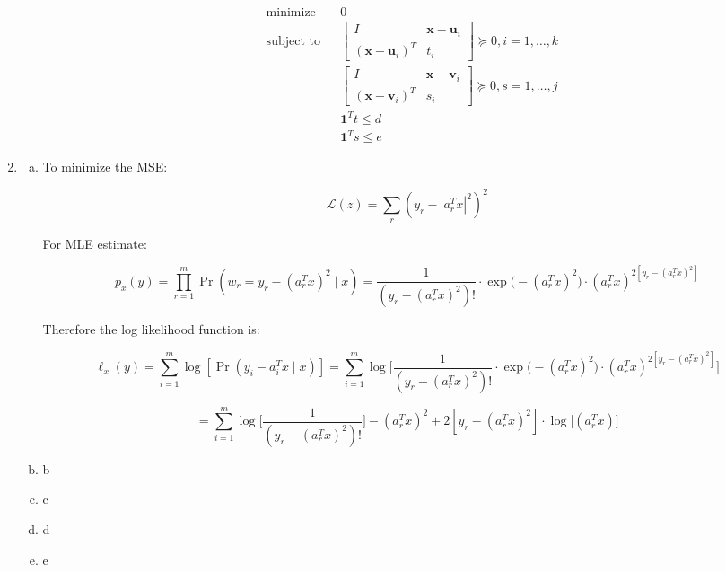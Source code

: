 \begin{enumerate}[(1)]
\begin{enumerate}[(a)]
\[
\boxed{
\begin{aligned}
& {\text{minimize}}
& & 0 \\
& \text{subject to}
& & \begin{bmatrix}
    I      & \boldsymbol{x} - \boldsymbol{u}_i\\
    (\boldsymbol{x} - \boldsymbol{u}_i)^T & t_i
\end{bmatrix} \succeq 0  , i = 1, \ldots, k \\
& & & \begin{bmatrix}
    I      & \boldsymbol{x} - \boldsymbol{v}_i\\
    (\boldsymbol{x} - \boldsymbol{v}_i)^T & s_i
\end{bmatrix} \succeq 0 , s = 1, \ldots, j \\
& & & \boldsymbol{1}^T t \leq d \\
& & & \boldsymbol{1}^T s \leq e
\end{aligned}}
\]

\end{enumerate}


\item

\begin{enumerate}[(a)]

\item To minimize the MSE:

\[
\mathcal{L}(z) = \sum_{r} (y_r - | a_r^T x|^2)^2 
\]

For MLE estimate:

\[
p_x(y) = \prod_{r=1}^m \Pr(w_r = y_r - (a_r^Tx)^2 \mid x) = \frac{1}{(y_r - (a_r^Tx)^2)!} \cdot \exp\big(-(a_r^Tx)^2 \big) \cdot (a_r^Tx)^{2 [y_r - (a_r^Tx)^2]}
\]

Therefore the log likelihood function is:

\[
\ell_x (y) = \sum_{i=1}^m \log [ \Pr(y_i - a_i^Tx \mid x)] = \sum_{i=1}^m \log \bigg[ \frac{1}{(y_r - (a_r^Tx)^2)!} \cdot \exp\big(-(a_r^Tx)^2 \big) \cdot (a_r^Tx)^{2[y_r - (a_r^Tx)^2]} \bigg]
\]

\[
= \sum_{i=1}^m  \log \bigg[\frac{1}{(y_r - (a_r^Tx)^2)!} \bigg]-(a_r^Tx)^2 + 2[y_r - (a_r^Tx)^2] \cdot \log \big[ (a_r^Tx) \big] 
\]

\item b
\item c

\item d

\item e

\end{enumerate}

\end{enumerate}

%
%
%
%
%
%
%
%

%
%
%